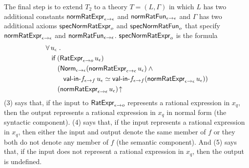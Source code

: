 \documentclass[fleqn]{llncs}
\begin{document}
\ee

\bsp The final step is to extend $T_2$ to a theory $T = (L,\Gamma)$ in
which $L$ has two additional constants $\mbox{\sf normRatExpr}_{\epsilon
  \rightarrow \epsilon}$ and $\mbox{\sf normRatFun}_{\epsilon \rightarrow
  \epsilon}$ and $\Gamma$ has two additional axioms
$\mbox{\sf specNormRatExpr}_o$ and $\mbox{\sf specNormRatFun}_o$ that
specify $\mbox{\sf normRatExpr}_{\epsilon \rightarrow \epsilon}$ and
$\mbox{\sf normRatFun}_{\epsilon \rightarrow
  \epsilon}$. $\mbox{\sf specNormRatExpr}_o$ is the formula
\esp
\begin{align}\setcounter{equation}{0}
&
\ForallApp u_\epsilon \mdot\\
& \hspace*{2ex}
\If \; (\mname{RatExpr}_{\epsilon \tarrow o} \, u_\epsilon)\\
& \hspace*{4ex}
(\mname{Norm}_{\epsilon \tarrow \epsilon}(\mname{normRatExpr}_{\epsilon \tarrow \epsilon} \, u_\epsilon) \And {}\\
& \hspace*{6ex}
\mname{val-in-}f_{\epsilon \tarrow f} \, u_\epsilon \QuasiEqual
\mname{val-in-}f_{\epsilon \tarrow f}(\mname{normRatExpr}_{\epsilon \tarrow \epsilon} \, u_\epsilon))\\
& \hspace*{4ex}
(\mname{normRatExpr}_{\epsilon \tarrow \epsilon} \, u_\epsilon)\IsUndefApp
\end{align}
(3) says that, if the input to $\mbox{\sf RatExpr}_{\epsilon \rightarrow o}$
represents a rational expression in $x_q$, then the output represents
a rational expression in $x_q$ in normal form (the syntactic
component).  (4) says that, if the input represents a rational
expression in $x_q$, then either the input and output denote the same
member of $f$ or they both do not denote any member of $f$ (the
semantic component).  And (5) says that, if the input does not
represent a rational expression in $x_q$, then the output is
undefined.
\end{document}
